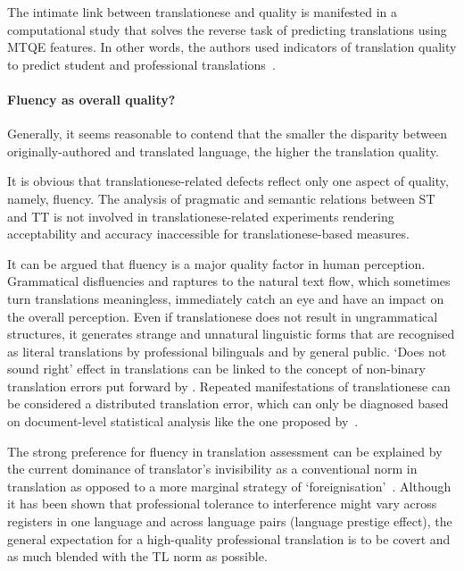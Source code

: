 The intimate link between translationese and quality is manifested in a computational study that solves the reverse task of predicting translations using \gls{MTQE} features. In other words, the authors used indicators of translation quality to predict student and professional translations~\cite{Rubino2016}.

\paragraph{Fluency as overall quality?} Generally, it seems reasonable to contend that the smaller the disparity between originally-authored and translated language, the higher the translation quality.

It is obvious that translationese-related defects reflect only one aspect of quality, namely, fluency. The analysis of pragmatic and semantic relations between ST and TT is not involved in translationese-related experiments rendering acceptability and accuracy inaccessible for translationese-based measures.

It can be argued that fluency is a major quality factor in human perception. Grammatical disfluencies and raptures to the natural text flow, which sometimes turn translations meaningless, immediately catch an eye and have an impact on the overall perception. Even if translationese does not result in ungrammatical structures, it generates strange and unnatural linguistic forms that are recognised as literal translations by professional bilinguals and by general public. `Does not sound right' effect in translations can be linked to the concept of non-binary translation errors put forward by \citet{Pym1992}. Repeated manifestations of translationese can be considered a distributed translation error, which can only be diagnosed based on document-level statistical analysis like the one proposed by~\citet{Sutter2017}. 

The strong preference for fluency in translation assessment can be explained by the current dominance of translator's invisibility as a conventional norm in translation as opposed to a more marginal strategy of `foreignisation'~\cite{Venuti1995}. 
Although it has been shown that professional tolerance to interference might vary across registers in one language and across language pairs (language prestige effect), the general expectation for a high-quality professional translation is to be covert and as much blended with the TL norm as possible. 

